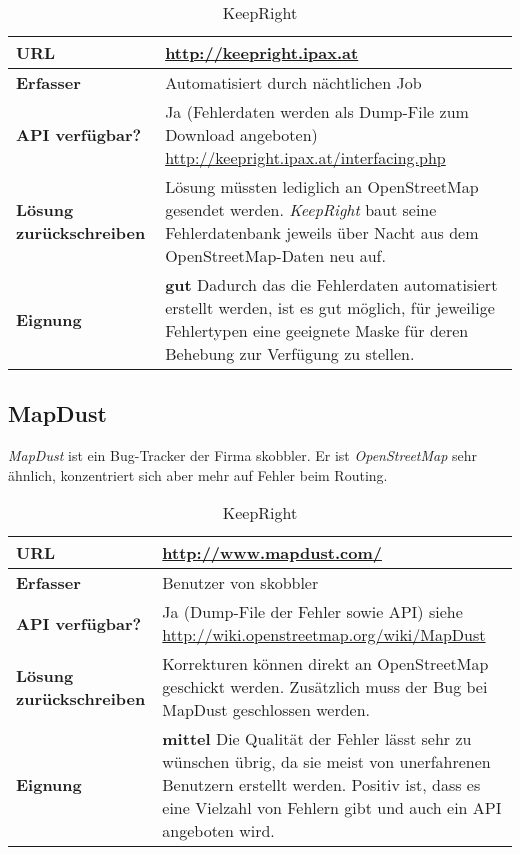 \begin{table}[H]
\centering
\begin{tabular}{|p{0.3\twocelltabwidth}|p{0.7\twocelltabwidth}|}
\hline 
\small{\textbf{URL}} & \url{http://keepright.ipax.at} \\
\hline 
\small{\textbf{Erfasser}} & Automatisiert durch nächtlichen Job \\
\hline 
\small{\textbf{API verfügbar?}} & Ja (Fehlerdaten werden als Dump-File zum Download angeboten) \newline \url{http://keepright.ipax.at/interfacing.php} \\
\hline 
\small{\textbf{Lösung zurückschreiben}} & Lösung müssten lediglich an \gls{OpenStreetMap} gesendet werden. \emph{KeepRight} baut seine Fehlerdatenbank jeweils über Nacht aus dem \gls{OpenStreetMap}-Daten neu auf. \\
\hline
\small{\textbf{Eignung}} & \textbf{gut} \linebreak Dadurch das die Fehlerdaten automatisiert erstellt werden, ist es gut möglich, für jeweilige Fehlertypen eine geeignete Maske für deren Behebung zur Verfügung zu stellen. \\
\hline
\end{tabular}
\caption{KeepRight}
\label{datenquellen-keepright}
\end{table}

\subsection{MapDust}
\emph{MapDust} ist ein Bug-Tracker der Firma skobbler.
Er ist \emph{OpenStreetMap} sehr ähnlich, konzentriert sich aber mehr auf Fehler beim Routing.

\begin{table}[H]
\centering
\begin{tabular}{|p{0.3\twocelltabwidth}|p{0.7\twocelltabwidth}|}
\hline 
\small{\textbf{URL}} & \url{http://www.mapdust.com/} \\
\hline 
\small{\textbf{Erfasser}} & Benutzer von skobbler \\
\hline 
\small{\textbf{API verfügbar?}} & Ja (Dump-File der Fehler sowie API) \newline siehe \url{http://wiki.openstreetmap.org/wiki/MapDust} \\
\hline 
\small{\textbf{Lösung zurückschreiben}} & Korrekturen können direkt an \gls{OpenStreetMap} geschickt werden.
Zusätzlich muss der Bug bei MapDust geschlossen werden. \\
\hline
\small{\textbf{Eignung}} & \textbf{mittel} \linebreak Die Qualität der Fehler lässt sehr zu wünschen übrig, da sie meist von unerfahrenen Benutzern erstellt werden. Positiv ist, dass es eine Vielzahl von Fehlern gibt und auch ein API angeboten wird. \\
\hline
\end{tabular}
\caption{KeepRight}
\label{datenquellen-keepright}
\end{table}

